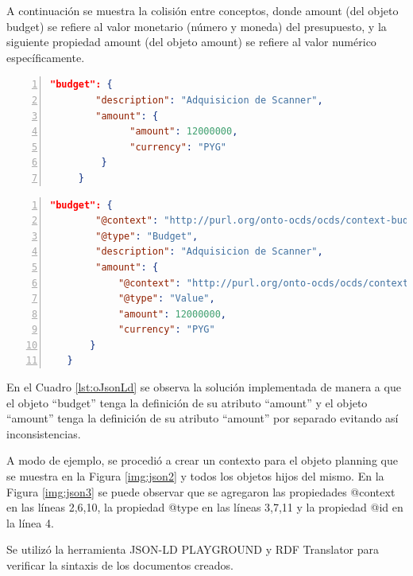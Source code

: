 A continuación se muestra la colisión entre conceptos, donde amount (del objeto budget) se refiere al valor monetario (número y moneda) del presupuesto, y la siguiente propiedad amount (del objeto amount) se refiere al valor numérico específicamente.\hfill \break

\noindent\begin{minipage}{\textwidth}
\begin{lstlisting}[captionpos=b, caption=Objeto JSON con colisión semántica entre conceptos, label=lst:oJson,language=json,firstnumber=1,  numbers=left,  numberstyle=\tiny\color{mygray},frame=single]
    "budget": {
        "description": "Adquisicion de Scanner",
        "amount": {
              "amount": 12000000,
              "currency": "PYG"
         }
     }  
    \end{lstlisting}
\end{minipage}
\noindent
\begin{minipage}{\textwidth}
    \begin{lstlisting}[captionpos=b, caption=Objeto JSON-LD. Sin colisión semántica entre conceptos , label=lst:oJsonLd, language=json,firstnumber=1,  numbers=left,  numberstyle=\tiny\color{mygray},frame=single]
    "budget": {
        "@context": "http://purl.org/onto-ocds/ocds/context-budget.json",
        "@type": "Budget",
        "description": "Adquisicion de Scanner",
        "amount": {
            "@context": "http://purl.org/onto-ocds/ocds/context-value.json",
            "@type": "Value",
            "amount": 12000000,
            "currency": "PYG"
       }
   }   
        \end{lstlisting}
    \end{minipage}

        En el Cuadro \ref{lst:oJsonLd} se observa la solución implementada de manera a que el objeto “budget” tenga la definición de su atributo “amount” y el objeto “amount” tenga la definición de su atributo “amount” por separado evitando así inconsistencias.

A modo de ejemplo, se procedió a crear un contexto para el objeto planning que se muestra en la Figura \ref{img:json2} y todos los objetos hijos del mismo. En la Figura \ref{img:json3} se puede observar que se agregaron las propiedades @context en las líneas 2,6,10, la propiedad @type en las líneas 3,7,11 y la propiedad @id en la línea 4.

Se utilizó la herramienta JSON-LD PLAYGROUND \cite{JSONLDPl78:online} y RDF Translator \cite{RDFTrans0:online} para verificar la sintaxis de los documentos creados.

